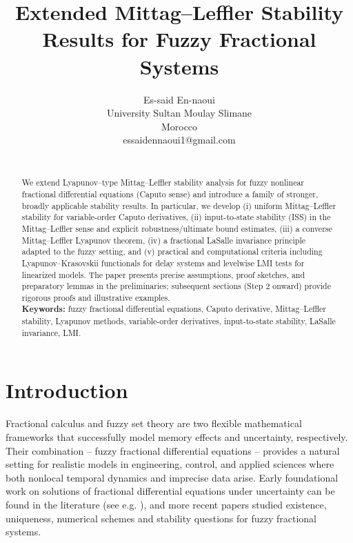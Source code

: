 \documentclass[11pt,a4paper]{article}
\theoremstyle{plain}
\theoremstyle{definition}
\theoremstyle{remark}
\begin{document}
	\title{Extended Mittag--Leffler Stability Results for Fuzzy Fractional Systems}
	
	\author{
		{ \sc Es-said En-naoui } \\ 
		University Sultan Moulay Slimane\\ Morocco\\
		essaidennaoui1@gmail.com\\
		\\
	}
	
	\maketitle
	
	\begin{abstract}
		We extend Lyapunov--type Mittag--Leffler stability analysis for fuzzy nonlinear fractional differential equations (Caputo sense) and introduce a family of stronger, broadly applicable stability results. In particular, we develop (i) uniform Mittag--Leffler stability for variable-order Caputo derivatives, (ii) input-to-state stability (ISS) in the Mittag--Leffler sense and explicit robustness/ultimate bound estimates, (iii) a converse Mittag--Leffler Lyapunov theorem, (iv) a fractional LaSalle invariance principle adapted to the fuzzy setting, and (v) practical and computational criteria including Lyapunov--Krasovskii functionals for delay systems and levelwise LMI tests for linearized models. The paper presents precise assumptions, proof sketches, and preparatory lemmas in the preliminaries; subsequent sections (Step 2 onward) provide rigorous proofs and illustrative examples.
		\medskip
		\\
		\textbf{Keywords:} fuzzy fractional differential equations, Caputo derivative, Mittag--Leffler stability, Lyapunov methods, variable-order derivatives, input-to-state stability, LaSalle invariance, LMI.
	\end{abstract}
	
	\section{Introduction}
	Fractional calculus and fuzzy set theory are two flexible mathematical frameworks that successfully model memory effects and uncertainty, respectively. Their combination -- fuzzy fractional differential equations -- provides a natural setting for realistic models in engineering, control, and applied sciences where both nonlocal temporal dynamics and imprecise data arise. Early foundational work on solutions of fractional differential equations under uncertainty can be found in the literature (see e.g. \cite{ElMfadel2021,Almeida2019VO,Podlubny1999}), and more recent papers studied existence, uniqueness, numerical schemes and stability questions for fuzzy fractional systems.
	
\end{document}
